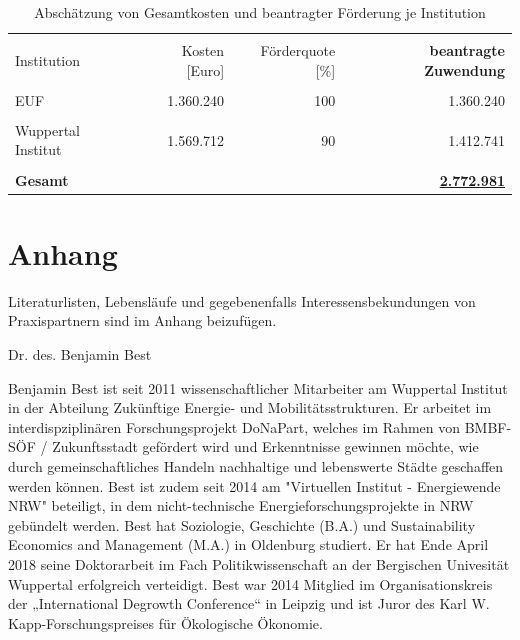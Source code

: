 \documentclass[a4paper,11pt,twoside]{scrartcl}
\begin{document}
\begin{table}[h]
\begin{center}
  \caption{Abschätzung von Gesamtkosten und beantragter Förderung je Institution}
\begin{tabular}[h]{|l | r | r | r|}
\hline
&&&\\
Institution & Kosten [Euro] & Förderquote [\%] & \textbf{beantragte Zuwendung}\\
\hline
\hline
 &&&\\
 EUF & 1.360.240 & 100 & 1.360.240\\
 \hline
 &&&\\
 Wuppertal Institut & 1.569.712 & 90 & 1.412.741

\\
 \hline
 \hline
 &&&\\
 \textbf{Gesamt} & & &\underline{\textbf{2.772.981}}\\
 \hline
 \end{tabular}
 \label{tab:kostenkalkulation2}
\end{center}
\end{table}

\clearpage


%


\clearpage
\appendix

\section{Anhang}

Literaturlisten, Lebensläufe und gegebenenfalls Interessensbekundungen von Praxispartnern sind im Anhang beizufügen.

Dr. des. Benjamin Best 

Benjamin Best ist seit 2011 wissenschaftlicher Mitarbeiter am Wuppertal Institut in der Abteilung Zukünftige Energie- und Mobilitätsstrukturen. Er arbeitet im interdispziplinären Forschungsprojekt DoNaPart, welches im Rahmen von BMBF-SÖF / Zukunftsstadt gefördert wird und Erkenntnisse gewinnen möchte, wie durch gemeinschaftliches Handeln nachhaltige und lebenswerte Städte geschaffen werden können. Best ist zudem seit 2014 am "Virtuellen Institut - Energiewende NRW" beteiligt, in dem nicht-technische Energieforschungsprojekte in NRW gebündelt werden. 
Best hat Soziologie, Geschichte (B.A.) und Sustainability Economics and Management (M.A.) in Oldenburg studiert. Er hat Ende April 2018 seine Doktorarbeit im Fach Politikwissenschaft an der Bergischen Univesität Wuppertal erfolgreich verteidigt. Best war 2014 Mitglied im Organisationskreis der „International Degrowth Conference“ in Leipzig und ist Juror des Karl W. Kapp-Forschungspreises für Ökologische Ökonomie. 
\end{document}

